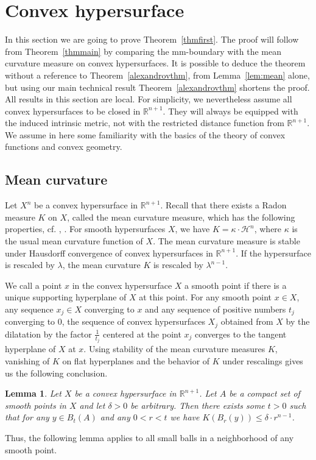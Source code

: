 \documentclass[12pt,leqno]{amsart}
\numberwithin{equation}{section}
\newtheorem{lem}[thm]{Lemma}
\theoremstyle{definition}
\theoremstyle{remark}
\newcommand{\tref}[1]{Theorem~\ref{#1}}
\newcommand{\lref}[1]{Lemma~\ref{#1}}
\newcommand{\R}{\mathbb{R}}
\begin{document}
\section{Convex hypersurface} \label{sec:hyper}
In this section we are going to prove \tref{thmfirst}. The proof will follow from \tref{thmmain} by comparing the mm-boundary with the mean curvature measure on convex hypersurfaces.
It is possible  to deduce the theorem without a reference to \tref{alexandrovthm}, from \lref{lem:mean} alone, but using  our main technical result \tref{alexandrovthm}
shortens the proof.   All results in this section are local. For simplicity, we nevertheless assume all convex hypersurfaces to be closed in $\R^{n+1}$. They will always be equipped with the induced intrinsic metric, not with the restricted distance function from $\mathbb R^{n+1}$.
We assume in here some familiarity with the  basics of the theory of convex functions and convex geometry.
\subsection{Mean curvature}
Let $X^n$ be a  convex hypersurface in $\R ^{n+1}$.  Recall that there exists a Radon measure $K$ on $X$, called the mean curvature measure, which has the following properties, cf. \cite{Schneider}, \cite{Fedcurvature}.
For smooth hypersurfaces $X$,  we have $K=\kappa \cdot \mathcal H^n$, where $\kappa$ is the  usual mean curvature function of $X$.
   The mean curvature measure is stable under Hausdorff convergence of convex hypersurfaces in $\R^{n+1}$. If the hypersurface is rescaled by $\lambda$, the mean curvature $K$ is rescaled by $\lambda ^{n-1}$.

We call a point $x$ in the convex hypersurface $X$ a smooth point if there is a unique supporting hyperplane of $X$ at this point.
For  any smooth point $x\in X$, any sequence $x_j\in X$  converging to $x$ and any sequence of positive numbers $t_j$ converging to $0$, the
sequence of convex hypersurfaces  $X_j$ obtained from $X$ by the  dilatation by the factor $\frac 1 {t_j}$ centered at the point $x_j$ converges
to the tangent hyperplane of $X$ at $x$. Using   stability of the mean curvature measures  $K$, vanishing of $K$ on   flat hyperplanes and
 the behavior of $K$ under rescalings gives us the following conclusion.
\begin{lem} \label{lem:compsm}
Let $X$ be a convex hypersurface in $\R^{n+1}$. Let $A$ be a compact set of smooth points in $X$ and let $\delta >0$ be arbitrary.
Then there exists some $t>0$ such that for any  $y\in B_{t} (A)$ and any $0<r<t$ we have $K(B_r(y))  \leq \delta \cdot r^{n-1}$.
\end{lem}
 Thus, the following lemma applies to all small balls in a neighborhood of any smooth point.
\end{document}
